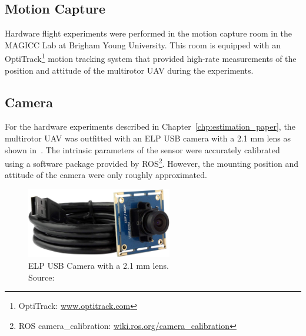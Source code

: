 \subsection{Motion Capture}
Hardware flight experiments were performed in the motion capture room in the
MAGICC Lab at Brigham Young University. This room is equipped with an OptiTrack\footnote{OptiTrack:
\url{www.optitrack.com}}
motion tracking system that
provided high-rate measurements of the position and attitude of the multirotor
UAV during the experiments.

\subsection{Camera}
For the hardware experiments described in Chapter~\ref{chp:estimation_paper},
the multirotor UAV was outfitted with an ELP USB camera with a 2.1 mm lens as
shown in~. The intrinsic parameters of the sensor were
accurately calibrated using a software package provided by ROS\footnote{ROS
camera\_calibration:
\url{wiki.ros.org/camera_calibration}}.
However, the mounting position and attitude of the camera were only roughly
approximated.

\begin{figure}[h]
  \centering
  \includegraphics[width=2.5in]{figures/camera.jpg}
  \caption[ELP USB Camera with 2.1 mm Lens]{ELP USB Camera with a 2.1 mm
    lens. \\ \hspace{\textwidth} Source:~\cite{webcam}
}
%
  \label{fig:camera}
\end{figure}

